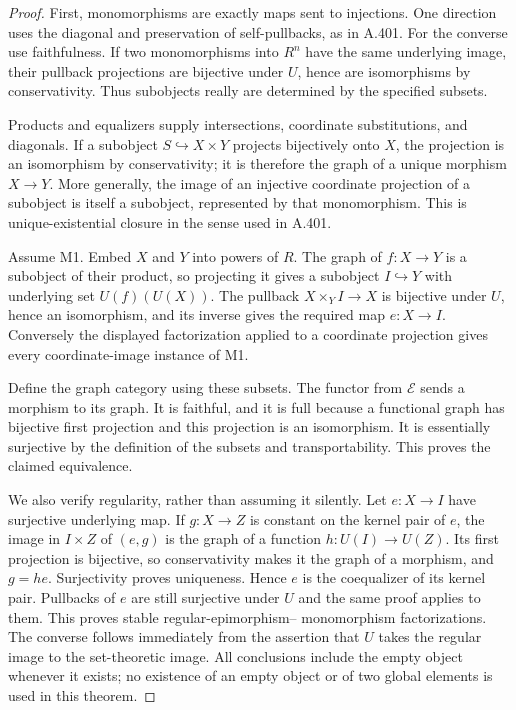 \begin{proof}
First, monomorphisms are exactly maps sent to injections. One direction
uses the diagonal and preservation of self-pullbacks, as in A.401.
For the converse use faithfulness. If two monomorphisms into $R^n$
have the same underlying image, their pullback projections are
bijective under $U$, hence are isomorphisms by conservativity.
Thus subobjects really are determined by the specified subsets.

Products and equalizers supply intersections, coordinate substitutions,
and diagonals. If a subobject $S\hookrightarrow X\times Y$ projects
bijectively onto $X$, the projection is an isomorphism by conservativity;
it is therefore the graph of a unique morphism $X\to Y$. More generally,
the image of an injective coordinate projection of a subobject is itself
a subobject, represented by that monomorphism. This is unique-existential
closure in the sense used in A.401.

Assume M1. Embed $X$ and $Y$ into powers of $R$. The graph of
$f:X\to Y$ is a subobject of their product, so projecting it gives a
subobject $I\hookrightarrow Y$ with underlying set $U(f)(U(X))$.
The pullback $X\times_Y I\to X$ is bijective under $U$, hence an
isomorphism, and its inverse gives the required map $e:X\to I$.
Conversely the displayed factorization applied to a coordinate projection
gives every coordinate-image instance of M1.

Define the graph category using these subsets. The functor from
$\mathcal E$ sends a morphism to its graph. It is faithful, and it is
full because a functional graph has bijective first projection and this
projection is an isomorphism. It is essentially surjective by the
definition of the subsets and transportability. This proves the claimed
equivalence.

We also verify regularity, rather than assuming it silently. Let
$e:X\to I$ have surjective underlying map. If $g:X\to Z$ is constant
on the kernel pair of $e$, the image in $I\times Z$ of $(e,g)$ is the
graph of a function $h:U(I)\to U(Z)$. Its first projection is bijective,
so conservativity makes it the graph of a morphism, and $g=he$.
Surjectivity proves uniqueness. Hence $e$ is the coequalizer of its
kernel pair. Pullbacks of $e$ are still surjective under $U$ and the
same proof applies to them. This proves stable regular-epimorphism--
monomorphism factorizations. The converse follows immediately from
the assertion that $U$ takes the regular image to the set-theoretic image.
All conclusions include the empty object whenever it exists; no existence
of an empty object or of two global elements is used in this theorem.
\end{proof}
